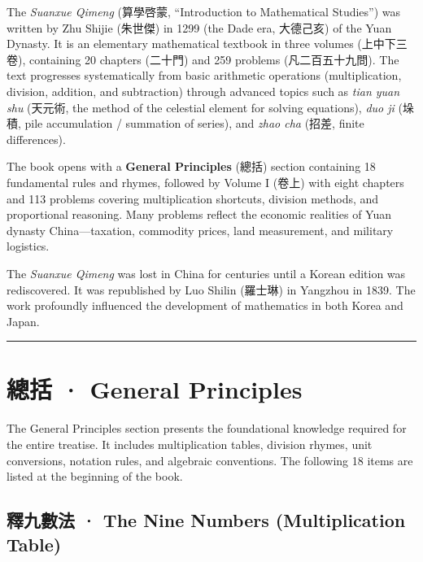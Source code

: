 \documentclass[11pt,a4paper]{article}
\newcommand{\longline}{\noindent\rule{\textwidth}{0.4pt}}
\begin{document}
The \textit{Suanxue Qimeng} (算學啓蒙, ``Introduction to Mathematical Studies'')
was written by Zhu Shijie (朱世傑) in 1299 (the Dade era, 大德己亥) of the Yuan Dynasty.
It is an elementary mathematical textbook in three volumes (上中下三卷), containing
20 chapters (二十門) and 259 problems (凡二百五十九問). The text progresses
systematically from basic arithmetic operations (multiplication, division, addition,
and subtraction) through advanced topics such as \textit{tian yuan shu} (天元術,
the method of the celestial element for solving equations), \textit{duo ji} (垛積,
pile accumulation / summation of series), and \textit{zhao cha} (招差, finite
differences).

The book opens with a \textbf{General Principles} (總括) section containing 18
fundamental rules and rhymes, followed by Volume I (卷上) with eight chapters
and 113 problems covering multiplication shortcuts, division methods, and
proportional reasoning. Many problems reflect the economic realities of Yuan
dynasty China---taxation, commodity prices, land measurement, and military logistics.

The \textit{Suanxue Qimeng} was lost in China for centuries until a Korean edition
was rediscovered. It was republished by Luo Shilin (羅士琳) in Yangzhou in 1839.
The work profoundly influenced the development of mathematics in both Korea and
Japan.

\longline

\section{總括 · General Principles}
\label{sec:zongguo}

The General Principles section presents the foundational knowledge required for
the entire treatise. It includes multiplication tables, division rhymes, unit
conversions, notation rules, and algebraic conventions. The following 18 items
are listed at the beginning of the book.

\subsection{釋九數法 · The Nine Numbers (Multiplication Table)}
\end{document}
